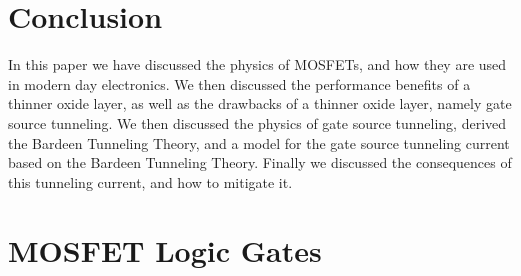 \documentclass[
  reprint,
  amsmath,amssymb,
  aps
]{revtex4-1}
\begin{document}
\section{\label{sec:level1}Conclusion}
In this paper we have discussed the physics of MOSFETs, and how they are used in modern day electronics. We then 
discussed the performance benefits of a thinner oxide layer, as well as the drawbacks of a thinner oxide layer, namely gate source tunneling.
We then discussed the physics of gate source tunneling, derived the Bardeen Tunneling Theory, and a 
model for the gate source tunneling current based on the Bardeen Tunneling Theory. Finally we discussed the consequences of this 
tunneling current, and how to mitigate it.





\appendix
\section{MOSFET Logic Gates}
\end{document}

